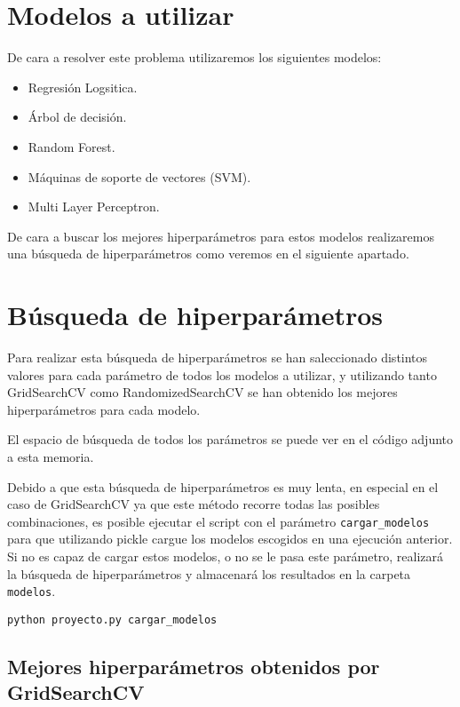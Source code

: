 \section{Modelos a utilizar}

De cara a resolver este problema utilizaremos los siguientes modelos:

\begin{itemize}
	\item Regresión Logsitica.
	\item Árbol de decisión.
	\item Random Forest.
	\item Máquinas de soporte de vectores (SVM).
	\item Multi Layer Perceptron.
\end{itemize}


De cara a buscar los mejores hiperparámetros para estos modelos realizaremos una búsqueda de hiperparámetros como veremos en el siguiente apartado.

\section{Búsqueda de hiperparámetros}

Para realizar esta búsqueda de hiperparámetros se han saleccionado distintos valores para cada parámetro de todos los modelos a utilizar, y utilizando tanto GridSearchCV como RandomizedSearchCV se han obtenido los mejores hiperparámetros para cada modelo.

El espacio de búsqueda de todos los parámetros se puede ver en el código adjunto a esta memoria.

Debido a que esta búsqueda de hiperparámetros es muy lenta, en especial en el caso de GridSearchCV ya que este método recorre todas las posibles combinaciones, es posible ejecutar el script con el parámetro \texttt{cargar\_modelos} para que utilizando pickle cargue los modelos escogidos en una ejecución anterior. Si no es capaz de cargar estos modelos, o no se le pasa este parámetro, realizará la búsqueda de hiperparámetros y almacenará los resultados en la carpeta \texttt{modelos}.

\begin{lstlisting}
python proyecto.py cargar_modelos
\end{lstlisting}

\subsection{Mejores hiperparámetros obtenidos por GridSearchCV}


